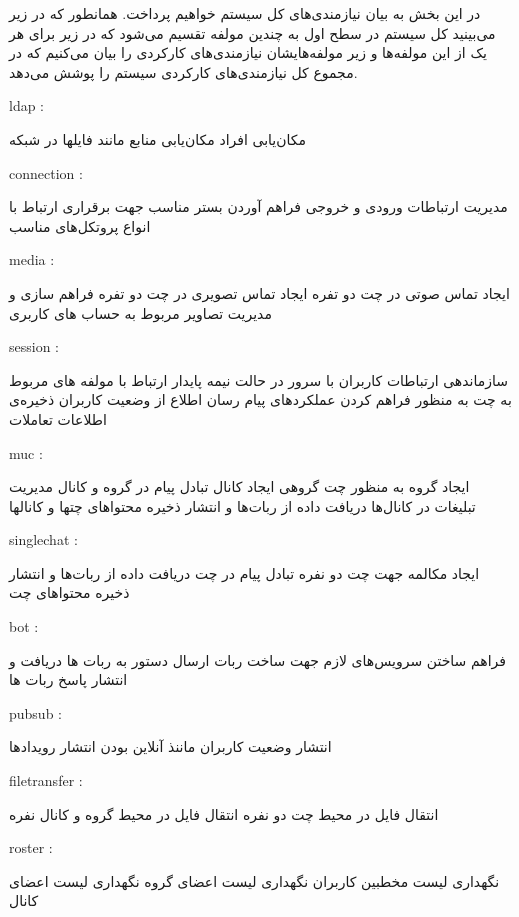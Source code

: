 در این بخش به بیان نیازمندی‌های کل سیستم خواهیم پرداخت. همانطور که در زیر می‌بینید کل سیستم در سطح اول به چندین مولفه تقسیم می‌شود که در زیر برای هر یک از این مولفه‌ها و زیر مولفه‌هایشان نیازمندی‌های کارکردی را بیان می‌کنیم که در مجموع کل نیازمندی‌های کارکردی سیستم را پوشش می‌دهد.
\begin{itemize}
 ldap : 
\begin{itemize}
 مکان‌یابی افراد
 مکان‌یابی منابع مانند فایلها در شبکه 
\end{itemize}
   connection :
\begin{itemize}
  مدیریت ارتباطات ورودی و خروجی
 فراهم آوردن بستر مناسب جهت برقراری ارتباط با انواع پروتکل‌های مناسب
\end{itemize}
 media : 
\begin{itemize}
	 ایجاد تماس صوتی در چت دو تفره
	 ایجاد تماس تصویری در چت دو تفره
	 فراهم سازی و مدیریت تصاویر مربوط به حساب های کاربری
	
\end{itemize}
  session :
\begin{itemize}
	 سازماندهی ارتباطات کاربران با سرور در حالت نیمه پایدار
	 ارتباط با مولفه های مربوط به چت به منظور فراهم کردن عملکردهای پیام رسان
	 اطلاع از وضعیت کاربران
	 ذخیره‌ی اطلاعات تعاملات
\end{itemize}

 muc : 
\begin{itemize}
 ایجاد گروه به منظور چت گروهی
 ایجاد کانال
 تبادل پیام در گروه و کانال
 مدیریت تبلیغات در کانال‌ها
 دریافت داده از ربات‌ها و انتشار
 ذخیره محتواهای چتها و کانالها
\end{itemize}

 singlechat :

\begin{itemize}
 ایجاد مکالمه جهت چت دو نفره
 تبادل پیام در چت
 دریافت داده از ربات‌ها و انتشار
 ذخیره محتواهای چت 

\end{itemize}
 bot : 
\begin{itemize}
 فراهم ساختن سرویس‌های لازم جهت ساخت ربات
 ارسال دستور به ربات ها
 دریافت و انتشار پاسخ ربات ها
\end{itemize}

 pubsub :
\begin{itemize}
 انتشار وضعیت کاربران ماننذ آنلاین بودن
 انتشار رویدادها
\end{itemize}
  filetransfer : 
\begin{itemize}
 انتقال فایل در محیط چت دو نفره
 انتقال فایل در محیط گروه و کانال نفره
\end{itemize}
 roster :
\begin{itemize}
 نگهداری لیست مخطبین کاربران
 نگهداری لیست اعضای گروه
 نگهداری لیست اعضای کانال
\end{itemize}


\end{itemize}

